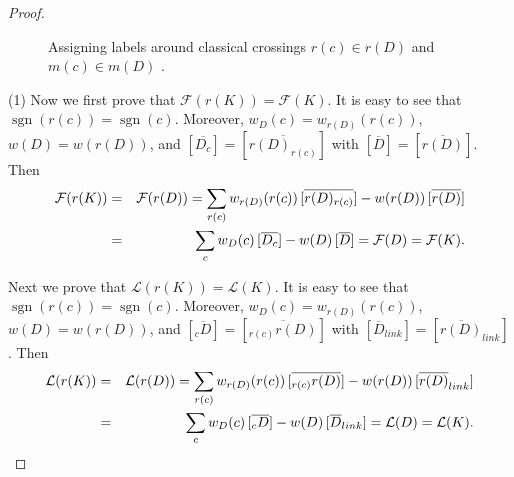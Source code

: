 \documentclass[11pt]{amsart}
\theoremstyle{noparens}
\numberwithin{equation}{section}
\numberwithin{equation}{section}
\begin{document}
\begin{proof}
\begin{figure}[!ht]
\begin{center}
\caption{Assigning labels around classical crossings $r(c) \in r(D)$ and $m(c) \in m(D)$ .} \label{fig111}
\end{center}
\end{figure}	

(1) Now we first prove that $\mathcal{F} (r(K) )=\mathcal{F} ( K )$. 
It is easy to see that $\operatorname{sgn}(r(c)) = \operatorname{sgn}(c)$. Moreover, $w_{D}(c)=w_{r(D)}(r(c))$, $w(D)=w(r(D))$, and $[\overline{D_c}] = [\overline{r(D)_{r(c)}}]$ with $[\overline{D}] = [\overline{r(D)}]$. Then   
\begin{eqnarray*}
\mathcal{F} (r(K)) &= & \mathcal{F} (r(D)) = \sum _ {r(c)} w_{r(D)} (r(c)) \, [\overline{r(D)_{r(c)}}] - w (r(D)) \, [\overline{r(D)}]  \cr 
& = & \sum_{c} w_D(c) \, [\overline{D_c}] - w(D) \, [\overline{D}] 
=\mathcal{F} (D) = \mathcal{F} (K).
\end{eqnarray*}

Next we prove that $\mathcal{L} (r(K) )=\mathcal{L} (K)$. It is easy to see that $\operatorname{sgn}(r(c)) = \operatorname{sgn}(c)$. Moreover, $w_{D}(c)=w_{r(D)}(r(c))$, $w(D)=w(r(D))$, and $[\overline{{}_cD}] = [\overline{{}_{r(c)}r(D)}]$ with $[\overline{D}_{link}] = [\overline{r(D)}_{link}]$. Then   
\begin{eqnarray*}
\mathcal{L} (r(K)) & = & \mathcal{L} (r(D)) = \sum _ {r(c)} w_{r(D)} (r(c)) \, [\overline{{}_{r(c)}r(D)}] - w (r(D)) \, [\overline{r(D)}_{link}] \cr 
& = & \sum_{c} w_D(c) \, [\overline{{}_cD}] - w(D) \, [\overline{D}_{link}] 
=\mathcal{L} (D) = \mathcal{L} (K).
\end{eqnarray*}


\end{proof}
\end{document}
